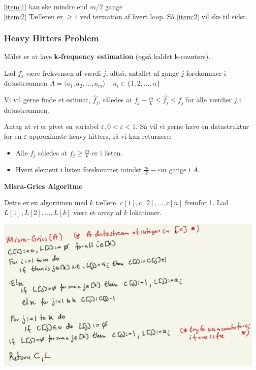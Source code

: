 \documentclass[11pt]{article}
\theoremstyle{definition}
\theoremstyle{remark}
\begin{document}
\noindent
\ref{item:1} kan ske mindre end $m/2$ gange\\
\noindent
\ref{item:2} Tælleren er $\geq 1$ ved termation af hvert loop. Så \ref{item:2} vil ske til sidst.

\subsubsection{Heavy Hitters Problem}

Målet er at lave \textbf{k-frequency estimation} (også kaldet k-counters).

Lad $f_{j}$ være frekvensen af værdi $j$, altså, antallet af gange $j$ forekommer i datastrømmen $A = \langle a_{1}, a_{2}, \ldots, a_{m} \rangle\;\;\;\;a_{i} \in \{1, 2, \ldots, n\}$

Vi vil gerne finde et estimat, $\hat{f_{j}}$, således at $f_{j} - \frac{m}{k} \leq \hat{f_{j}} \leq f_{j}$ for alle værdier $j$ i datastrømmen.

Antag at vi er givet en variabel $\varepsilon, 0 < \varepsilon < 1$. Så vil vi gerne have en datastruktur for en $\varepsilon$-approximate heavy hitters, så vi kan returnere:
\begin{itemize}
\item Alle $f_{j}$ således at $f_{j} \geq \frac{m}{k}$ er i listen.
\item Hvert element i listen forekommer mindst $\frac{m}{k} - \varepsilon m$ gange i $A$.
\end{itemize}

\noindent
\large\textbf{Misra-Gries Algoritme}

Dette er en algoritmen med $k$ tællere, $c[1], c[2], \ldots, c[n]$ fremfor 1. Lad $L[1], L[2], \ldots, L[k]$ være et array af $k$ lokationer.

\begin{center}
\includegraphics[scale=0.3]{misra.png}
\end{center}
\end{document}
